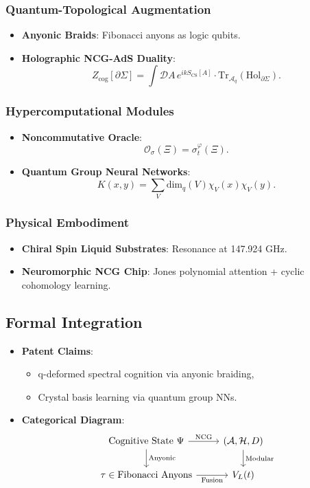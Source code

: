 \documentclass[12pt]{article}
\begin{document}
\subsubsection{Quantum-Topological Augmentation}
\begin{itemize}
    \item \textbf{Anyonic Braids}: Fibonacci anyons as logic qubits.
    \item \textbf{Holographic NCG-AdS Duality}:
    \[
    Z_{\text{cog}}[\partial \Sigma] = \int \mathcal{D}A \, e^{ik S_{\text{CS}}[A]} \cdot \text{Tr}_{\mathcal{A}_q}(\text{Hol}_{\partial \Sigma}).
    \]
\end{itemize}

\subsubsection{Hypercomputational Modules}
\begin{itemize}
    \item \textbf{Noncommutative Oracle}:
    \[
    \mathcal{O}_{\sigma}(\Xi) = \sigma_t^{\varphi}(\Xi).
    \]
    \item \textbf{Quantum Group Neural Networks}:
    \[
    K(x,y) = \sum_V \text{dim}_q(V) \chi_V(x)\chi_V(y).
    \]
\end{itemize}

\subsubsection{Physical Embodiment}
\begin{itemize}
    \item \textbf{Chiral Spin Liquid Substrates}: Resonance at 147.924 GHz.
    \item \textbf{Neuromorphic NCG Chip}: Jones polynomial attention + cyclic cohomology learning.
\end{itemize}

\subsection{Formal Integration}
\begin{itemize}
    \item \textbf{Patent Claims}:
    \begin{itemize}
        \item q-deformed spectral cognition via anyonic braiding,
        \item Crystal basis learning via quantum group NNs.
    \end{itemize}
    \item \textbf{Categorical Diagram}:
    \[
    \begin{tikzcd}
    \text{Cognitive State } \Psi \arrow[r, "\text{NCG}"] \arrow[d, "\text{Anyonic}"] & (\mathcal{A}, \mathcal{H}, D) \arrow[d, "\text{Modular}"] \\
    \tau \in \text{Fibonacci Anyons} \arrow[r, "\text{Fusion}"'] & V_L(t)
    \end{tikzcd}
    \]
\end{itemize}
\end{document}
